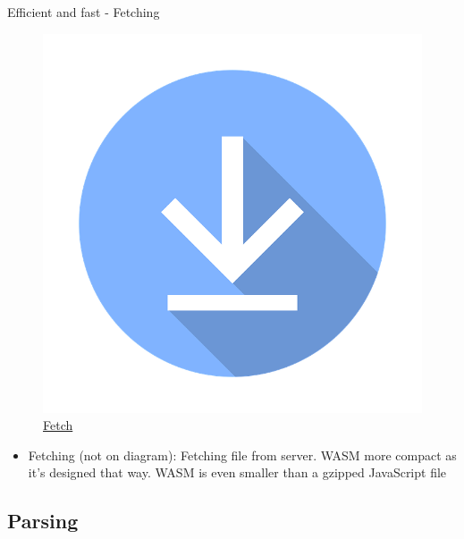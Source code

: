 \documentclass{beamer}
\begin{document}
\begin{frame}{Efficient and fast - Fetching}
    \begin{figure}
        \includegraphics[scale=0.15]{./images/download.png}
        \caption{\href{https://icon-library.com/icon/download-icon-file-4.html}{Fetch}}
    \end{figure}
    \begin{itemize}
        \item Fetching (not on diagram): Fetching file from server. WASM more compact as it's designed that way. WASM is even smaller than a gzipped JavaScript file
    \end{itemize}
\end{frame}

\subsection{Parsing}
\end{document}
